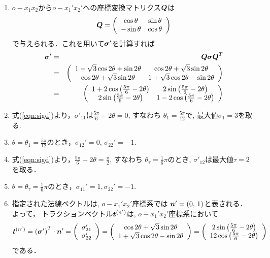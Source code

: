 \documentclass[10pt,a4j]{jarticle}
\begin{document}
\begin{enumerate}
\item
$o-x_1x_2$から$o-x_1'x_2'$への座標変換マトリクス$\mbox{\boldmath $Q$}$は
\[
	\mbox{\boldmath $Q$}=\left(
		\begin{array}{cc}
			\cos \theta & \sin \theta \\
			-\sin\theta & \cos \theta
		\end{array}
	\right)
\]
で与えられる．これを用いて$\mbox{\boldmath $\sigma$}'$を計算すれば
\begin{eqnarray}
	\mbox{\boldmath $\sigma$} ' 
	&=& 
	\mbox{\boldmath $Q \sigma Q$}^T\\
	&=&
 	\left( 
 	\begin{array}{cc}
		1- \sqrt{3} \cos 2\theta+ \sin 2 \theta & 
		\cos 2\theta +\sqrt{3}\sin 2\theta  \\
		\cos 2\theta +\sqrt{3}\sin 2\theta   &
		1+ \sqrt{3} \cos 2\theta - \sin 2 \theta 
	\end{array}
	\right) \\
 &=&
 \left(
 	\begin{array}{cc}
		1+ 2 \cos \left( \frac{5\pi}{6} -2\theta\right) & 
		2\sin \left(\frac{5\pi}{6} -2 \theta\right) \\
		2\sin \left(\frac{5\pi}{6} -2 \theta\right) & 
		1- 2 \cos \left( \frac{5\pi}{6} -2\theta\right) 
 	\end{array}
 \right)
	\label{eqn:sigd}
\end{eqnarray}
\item
	式(\ref{eqn:sigd})より，$\sigma'_{11}$は$\frac{5\pi}{6} -2\theta=0$, すなわち
	$\theta_1=\frac{5\pi}{12}$で, 最大値$\sigma_1=3$を取る.
\item
	$\theta=\theta_1=\frac{5\pi}{12}$のとき，$\sigma_{12}'=0,\, \sigma_{22}'=-1$.
\item
	式(\ref{eqn:sigd})より，$\frac{5\pi}{6}-2\theta=\frac{\pi}{2}$, すなわち
	$\theta_\tau=\frac{1}{6}\pi$のとき, $\sigma'_{12}$は最大値$\tau=2$を取る．
\item
	$\theta=\theta_{\tau}=\frac{1}{6}\pi$のとき，$\sigma_{11}'=1,\sigma_{22}'=-1$.
\item
	指定された法線ベクトルは, $o-x_1'x_2'$座標系では
	$\mbox{\boldmath $n$}'=(0,\, 1)$と表される． よって，
	トラクションベクトル$\mbox{\boldmath $t$}^{(n')}$は, $o-x_1'x_2'$座標系において
	\begin{equation}
		\mbox{\boldmath $t$}^{(n')}= \left( \mbox{\boldmath $\sigma$}'\right)^T \cdot \mbox{\boldmath $n$}'
		= 
		\left( 
			\begin{array}{c} 
				\sigma_{21}' \\ 
				\sigma_{22}'
			\end{array}
		\right)
		=
		\left(
			\begin{array}{c}
				\cos 2\theta +\sqrt{3} \sin 2\theta \\
				1+ \sqrt{3} \cos 2\theta-\sin 2 \theta 
			\end{array}
		\right)
		=
		\left(
			\begin{array}{c}
			2\sin \left(\frac{5\pi}{6} -2 \theta\right)\\
			1 2 \cos \left( \frac{5\pi}{6} -2\theta\right)
 		\end{array}
		\right) 
	\end{equation}
	である．
\end{enumerate}
\end{document}

